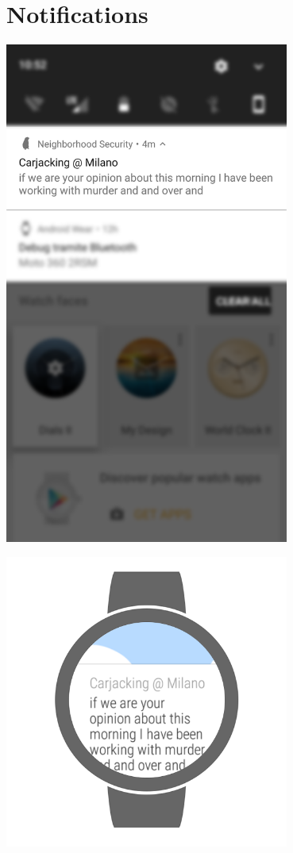 \documentclass[a4paper]{scrreprt}
\begin{document}
\section{Notifications}
\begin{minipage}{0.33\textwidth}
	\centering
	\includegraphics[width=0.7\textwidth]{notification_android.png}
\end{minipage}
\begin{minipage}{0.33\textwidth}
	\centering
	\includegraphics[width=0.7\textwidth]{notification_wear_text.png}
\end{minipage}
\end{document}
